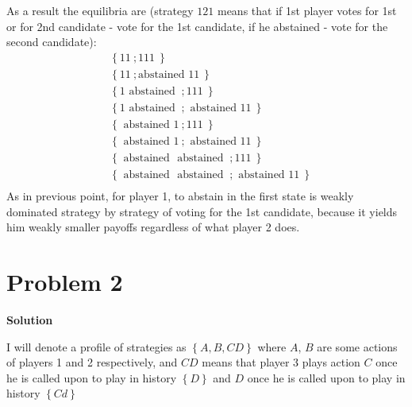 \documentclass[a4paper]{article}
\begin{document}
\begin{enumerate}[(a)]
	As a result the equilibria are (strategy $121$ means that if 1st player votes for 1st or for 2nd candidate - vote for the 1st candidate, if he abstained - vote for the second candidate):
	\begin{align*}
	&\left\{11\ ; 111\ \right\}\\
	&\left\{11\ ; \text{abstained }11\ \right\}\\
	&\left\{1 \text{ abstained }\ ; 111\ \right\}\\
	&\left\{1\text{ abstained }\ ; \text{ abstained }11\ \right\}\\
	&\left\{\text{ abstained } 1\ ; 111\ \right\}\\
	&\left\{\text{ abstained } 1\ ; \text{ abstained }11\ \right\}\\
	&\left\{\text{ abstained }\text{ abstained }\ ; 111\ \right\}\\
	&\left\{\text{ abstained }\text{ abstained }\ ; \text{ abstained }11\ \right\}\\	
	\end{align*}
	As in previous point, for player 1, to abstain in the first state is weakly dominated strategy by strategy of voting for the 1st candidate, because it yields him weakly smaller payoffs regardless of what player 2 does.
	\end{enumerate}

\section*{Problem 2}

\textbf{Solution}


I will denote a profile of strategies as $\left\{A, B, CD\right\}$ where $A$, $B$ are some actions of players 1 and 2 respectively, and $CD$ means that player 3 plays action $C$ once he is called upon to play in history $\left\{D\right\}$ and $D$ once he is called upon to play in history $\left\{Cd\right\}$
\end{document}
